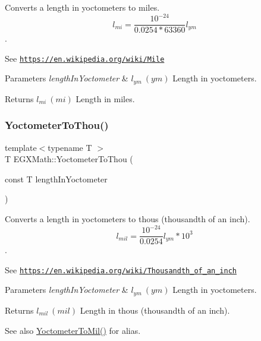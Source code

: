 Converts a length in yoctometers to miles. \[ l_{mi}=\frac{10^{-24}}{0.0254 * 63360} l_{ym} \]. 

See \href{https://en.wikipedia.org/wiki/Mile}{\tt https\+://en.\+wikipedia.\+org/wiki/\+Mile} 
\begin{DoxyParams}{Parameters}
{\em length\+In\+Yoctometer} & $ l_{ym}\ (ym)$ Length in yoctometers. \\
\hline
\end{DoxyParams}
\begin{DoxyReturn}{Returns}
$ l_{mi}\ (mi)$ Length in miles. 
\end{DoxyReturn}
\mbox{\label{group___e_g_x_math-_conversions-_length_conversions-_yoctometer-_imperial_ga9c2fbce1711afe0740edd868815ffea1}} 
\subsubsection{\texorpdfstring{Yoctometer\+To\+Thou()}{YoctometerToThou()}}
{\footnotesize\ttfamily template$<$typename T $>$ \\
T E\+G\+X\+Math\+::\+Yoctometer\+To\+Thou (\begin{DoxyParamCaption}\item[{const T}]{length\+In\+Yoctometer }\end{DoxyParamCaption})}



Converts a length in yoctometers to thous (thousandth of an inch). \[ l_{mil}= \frac{10^{-24}}{0.0254} l_{ym} * 10^{3} \]. 

See \href{https://en.wikipedia.org/wiki/Thousandth_of_an_inch}{\tt https\+://en.\+wikipedia.\+org/wiki/\+Thousandth\+\_\+of\+\_\+an\+\_\+inch} 
\begin{DoxyParams}{Parameters}
{\em length\+In\+Yoctometer} & $ l_{ym}\ (ym)$ Length in yoctometers. \\
\hline
\end{DoxyParams}
\begin{DoxyReturn}{Returns}
$ l_{mil}\ (mil)$ Length in thous (thousandth of an inch). 
\end{DoxyReturn}
\begin{DoxySeeAlso}{See also}
\mbox{\hyperlink{group___e_g_x_math-_conversions-_length_conversions-_yoctometer-_imperial_gacb2a1154ec79cfd130de96e92dfeedfa}{Yoctometer\+To\+Mil()}} for alias. 
\end{DoxySeeAlso}
\mbox{\label{group___e_g_x_math-_conversions-_length_conversions-_yoctometer-_imperial_gaa9c695208d05175797ee88adef7bd5f2}} 
